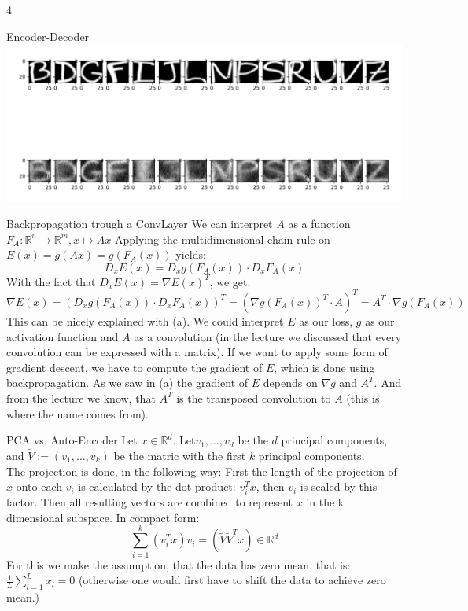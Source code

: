 \documentclass{article}
\begin{document}
\begin{ukon-infie}[28.1.18]{4}
\begin{exercise}[p=60]{Encoder-Decoder}
{		\includegraphics[scale=0.5]{latent_space.png}
		}
		
		\end{exercise}
		
		\begin{exercise}[p=10]{Backpropagation trough a ConvLayer}
		\question{}
		{
		We can interpret $A$ as a function $F_A: \mathbb{R}^n \rightarrow \mathbb{R}^m, x \mapsto Ax$
		Applying the multidimensional chain rule on $E(x) = g(Ax) = g(F_A(x))$ yields:\\
		$$D_xE(x) = D_xg(F_A(x)) \cdot D_xF_A(x)$$
		With the fact that $D_xE(x) = \nabla E(x)^T$, we get:\\
		$$\nabla E(x) = (D_xg(F_A(x)) \cdot D_xF_A(x))^T = (\nabla g(F_A(x))^T \cdot A)^T = A^T \cdot \nabla g(F_A(x))$$
		}
		\question{}
		{
			This can be nicely explained with (a). We could interpret $E$ as our loss, $g$ as our activation function and $A$ as a convolution (in the lecture we discussed that every convolution can be expressed with a matrix). If we want to apply some form of gradient descent, we have to compute the gradient of $E$, which is done using backpropagation. As we saw in (a) the gradient of $E$ depends on $\nabla g$ and $A^T$. And from the lecture we know, that $A^T$ is the transposed convolution to $A$ (this is where the name comes from).
		}
		
		\end{exercise}
		\begin{exercise}[p=20]{PCA vs. Auto-Encoder}
		\question{}
		{
		Let $x \in \mathbb{R}^d$. Let$v_1, \dots , v_d$ be the $d$ principal components, and $\tilde{V} := (v_1, \dots, v_k)$ be the matric with the first $k$ principal components.\\
		The projection is done, in the following way: First the length of the projection of $x$  onto each $v_i$ is calculated by the dot product: $v_i^T x$, then $v_i$ is scaled by this factor. Then all resulting vectors are combined to represent $x$ in the k dimensional subspace. In compact form:\\
		$$ \sum_{i=1}^k (v_i^T x)v_i = (\tilde{V}\tilde{V}^Tx) \in \mathbb{R}^d$$
		}
		\question{}
		{
			For this we make the assumption, that the data has zero mean, that is: $\frac{1}{L}\sum_{l=1}^L x_l = 0$ (otherwise one would first have to shift the data to achieve zero mean.)\\
			
}
\end{exercise}
\end{ukon-infie}
\end{document}
